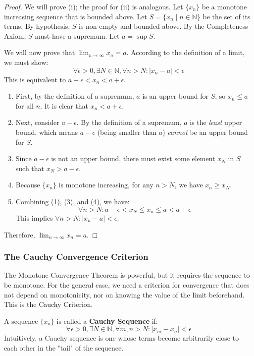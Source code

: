 \documentclass[oneside]{book}
\begin{document}
\begin{proof}
We will prove (i); the proof for (ii) is analogous.
Let $\{x_n\}$ be a monotone increasing sequence that is bounded above. Let $S = \{x_n \mid n \in \mathbb{N}\}$ be the set of its terms.
By hypothesis, $S$ is non-empty and bounded above.
By the Completeness Axiom, $S$ must have a supremum. Let $a = \sup S$.

We will now prove that $\lim_{n \to \infty} x_n = a$.
According to the definition of a limit, we must show:
\[
\forall \epsilon > 0, \exists N \in \mathbb{N}, \forall n > N: |x_n - a| < \epsilon
\]
This is equivalent to $a - \epsilon < x_n < a + \epsilon$.

\begin{enumerate}
    \item First, by the definition of a supremum, $a$ is an upper bound for $S$, so $x_n \leq a$ for all $n$. It is clear that $x_n < a + \epsilon$.
    \item Next, consider $a - \epsilon$. By the definition of a supremum, $a$ is the \textit{least} upper bound, which means $a - \epsilon$ (being smaller than $a$) \textit{cannot} be an upper bound for $S$.
    \item Since $a - \epsilon$ is not an upper bound, there must exist some element $x_N$ in $S$ such that $x_N > a - \epsilon$.
    \item Because $\{x_n\}$ is monotone increasing, for any $n > N$, we have $x_n \geq x_N$.
    \item Combining (1), (3), and (4), we have:
    \[
    \forall n > N: a - \epsilon < x_N \leq x_n \leq a < a + \epsilon
    \]
    This implies $\forall n > N: |x_n - a| < \epsilon$.
\end{enumerate}
Therefore, $\lim_{n \to \infty} x_n = a$.
\end{proof}

\subsubsection{The Cauchy Convergence Criterion}

The Monotone Convergence Theorem is powerful, but it requires the sequence to be monotone. For the general case, we need a criterion for convergence that does not depend on monotonicity, nor on knowing the value of the limit beforehand. This is the Cauchy Criterion.

\begin{definition}
A sequence $\{x_n\}$ is called a \textbf{Cauchy Sequence} if:
\[
\forall \epsilon > 0, \exists N \in \mathbb{N}, \forall m, n > N: |x_m - x_n| < \epsilon
\]
Intuitively, a Cauchy sequence is one whose terms become arbitrarily close to each other in the "tail" of the sequence.
\end{definition}
\end{document}
